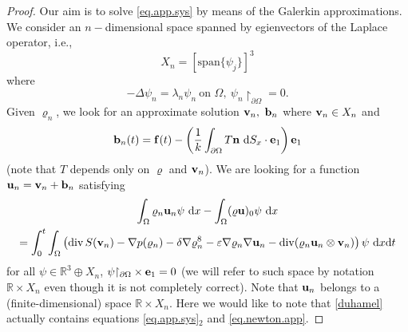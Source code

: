 \documentclass{article}
\DeclareMathOperator{\diver}{div}
\newcommand{\bb}{{\bf b}}
\newcommand{\vb}{\bb}
\newcommand{\be}{{\bf e}}
\newcommand{\ve}{\be}
\newcommand{\vf}{{\bf f}}
\newcommand{\bn}{{\bf n}}
\newcommand{\vn}{\bn}
\newcommand{\bu}{{\bf u}}
\newcommand{\vu}{\bu}
\newcommand{\bv}{{\bf v}}
\newcommand{\vv}{\bv}
\numberwithin{equation}{section}
\begin{document}
\begin{proof}
Our aim is to solve \eqref{eq.app.sys} by means of the Galerkin approximations. We consider an $n-$dimensional space spanned by egienvectors of the Laplace operator, i.e.,
$$
X_n = [{\mbox{span}}\{\psi_j\}]^3
$$
where
$$
 -\Delta \psi_n = \lambda_n \psi_n \ \mbox{on }\Omega,\ \psi_n{\restriction_{\partial\Omega}} = 0.
$$
Given $\varrho_n$, we look for an approximate solution $\vv_n,\ \vb_n$ where $\vv_n \in X_n$ and
$$
\vb_n(t) = \vf(t) - \left(\frac 1k \int_{\partial\Omega} T\vn \ {\rm d}S_x\cdot\ve_1 \right) \ve_1
$$
(note that $T$ depends only on $\varrho$ and $\vv_n$). We are looking for a function $\vu_n = \vv_n + \vb_n$  satisfying
\begin{multline}\label{duhamel}
\int_\Omega \varrho_n \vu_n\psi\ {\rm d}x - \int_\Omega (\varrho\vu)_0 \psi\ {\rm d}x \\
 = \int_0^t\int_\Omega \left(\diver S(\vv_n) - \nabla p(\varrho_n) - \delta\nabla \varrho_n^8 - \varepsilon \nabla\varrho_n\nabla\vu_n - \diver(\varrho_n \vu_n  \otimes\vv_n)\right) \psi \ {\rm d}x{\rm d}t
\end{multline}
for all $\psi\in \mathbb R^3\oplus X_n$, $\psi{\restriction_{\partial\Omega}} \times \ve_1 = 0$ (we will refer to such space by notation $\mathbb R\times X_n$ even though it is not completely correct). Note that $\vu_n$ belongs to a (finite-dimensional) space $\mathbb R\times X_n$. Here we would like to note that \eqref{duhamel} actually contains equations \eqref{eq.app.sys}$_2$ and \eqref{eq.newton.app}. %


\end{proof}
\end{document}
